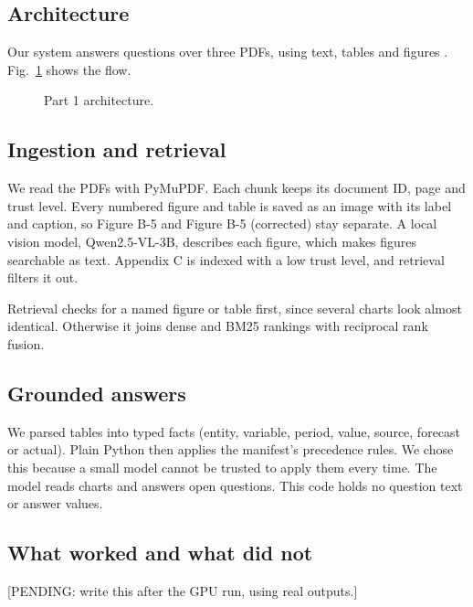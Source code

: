 \subsection{Architecture}
Our system answers questions over three PDFs, using text, tables and figures \cite{lewis}. Fig.~\ref{fig:p1} shows the flow.
\begin{figure}[!t]
\centering
{}
\caption{Part 1 architecture.}
\label{fig:p1}
\end{figure}

\subsection{Ingestion and retrieval}
We read the PDFs with PyMuPDF. Each chunk keeps its document ID, page and trust level. Every numbered figure and table is saved as an image with its label and caption, so Figure B-5 and Figure B-5 (corrected) stay separate. A local vision model, Qwen2.5-VL-3B, describes each figure, which makes figures searchable as text. Appendix C is indexed with a low trust level, and retrieval filters it out.

Retrieval checks for a named figure or table first, since several charts look almost identical. Otherwise it joins dense and BM25 rankings with reciprocal rank fusion.

\subsection{Grounded answers}
We parsed tables into typed facts (entity, variable, period, value, source, forecast or actual). Plain Python then applies the manifest's precedence rules. We chose this because a small model cannot be trusted to apply them every time. The model reads charts and answers open questions. This code holds no question text or answer values.

\subsection{What worked and what did not}
[PENDING: write this after the GPU run, using real outputs.]
